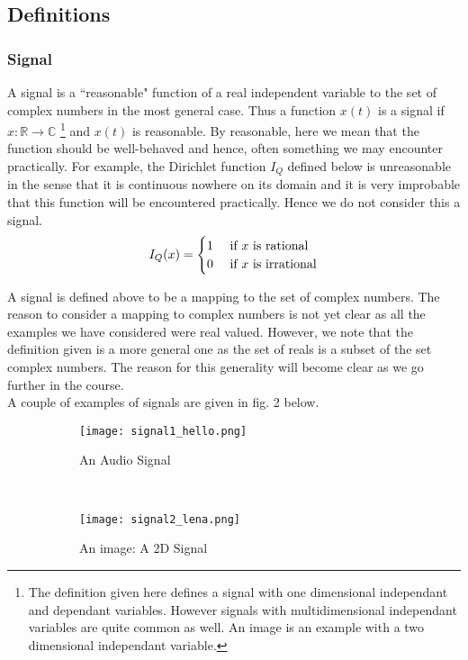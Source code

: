 \subsection{Definitions}
\subsubsection{Signal}
A signal is a ``reasonable" function of a real independent variable to the set of complex numbers in the most general case. Thus a function $x(t)$ is a signal if $x:\mathbb{R} \xrightarrow{} \mathbb{C}$ \footnote{The definition given here defines a signal with one dimensional independant and dependant variables. However signals with multidimensional independant variables are quite common as well. An image is an example with a two dimensional independant variable.} and $x(t)$ is reasonable. By reasonable, here we mean that the function should be well-behaved and hence, often something we may encounter practically. For example, the Dirichlet function $I_{Q}$ defined below is unreasonable in the sense that it is continuous nowhere on its domain and it is very improbable that this function will be encountered practically. Hence we do not consider this a signal.
\[
I_{Q}(x) =
  \begin{cases}
      \hfill 1 \hfill & \text{ if $x$ is rational} \\
      \hfill 0 \hfill & \text{ if $x$ is irrational} \\
  \end{cases}
\]

A signal is defined above to be a mapping to the set of complex numbers. The reason to consider a mapping to complex numbers is not yet clear as all the examples we have considered were real valued. However, we note that the definition given is a more general one as the set of reals is a subset of the set complex numbers. The reason for this generality will become clear as we go further in the course.\\

A couple of examples of signals are given in fig. 2 below.


\begin{figure}[H]
        \centering
        \begin{subfigure}[b]{\textwidth}
                \texttt{[image: signal1\_hello.png]}
                \caption{An Audio Signal}
        \end{subfigure}
        \quad
        ~ %
        \centering
        \begin{subfigure}[b]{0.5\textwidth}
                \texttt{[image: signal2\_lena.png]}
                \caption{An image: A 2D Signal}
        \end{subfigure}
        \caption{}
\end{figure}

